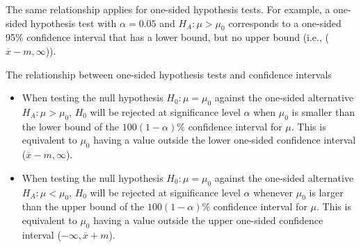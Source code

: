 The same relationship applies for one-sided hypothesis tests. For example, a one-sided hypothesis test with $\alpha = 0.05$ and $H_A: \mu > \mu_0$ corresponds to a one-sided 95\% confidence interval that has a lower bound, but no upper bound (i.e., ($\overline{x} - m, \infty$)).
	
\begin{onebox}{The relationship between one-sided hypothesis tests and confidence intervals}
\begin{itemize}
  \item When testing the null hypothesis $H_0:\mu = \mu_0$ against the one-sided alternative $H_A: \mu > \mu_0$, $H_0$ will be rejected at significance level $\alpha$ when $\mu_0$ is smaller than the lower bound of the $100(1-\alpha)\%$ confidence interval for $\mu$. This is equivalent to $\mu_0$ having a value outside the lower one-sided confidence interval ($\overline{x} - m, \infty$).
  \item When testing the null hypothesis $H_0:\mu = \mu_0$ against the one-sided alternative $H_A: \mu < \mu_0$, $H_0$ will be rejected at significance level $\alpha$ whenever $\mu_0$ is larger than the upper bound of the $100(1-\alpha)\%$ confidence interval for $\mu$. This is equivalent to $\mu_0$ having a value outside the upper one-sided confidence interval ($-\infty, \overline{x} + m$).
\end{itemize}
\end{onebox}

